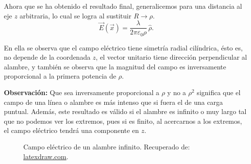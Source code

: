 Ahora que se ha obtenido el resultado final, generalicemos para una distancia al eje $z$ arbitraria, lo cual se logra al sustituir $R \rightarrow \rho$.
$$\vec{E}(\Vec{x}) = \frac{\lambda}{2 \pi \varepsilon_0 \rho}\, \hat{\rho}.$$

En ella se observa que el campo eléctrico tiene simetría radial cilíndrica, ésto es, no depende de la coordenada $z$, el vector unitario tiene dirección perpendicular al alambre, y también se observa que la magnitud del campo es inversamente proporcional a la primera potencia de $\rho$.

\textbf{Observación:} Que sea inversamente proporcional a $\rho$ y no a $\rho^2$ significa que el campo de una línea o alambre es más intenso que si fuera el de una carga puntual. Además, este resultado es válido si el alambre es infinito o muy largo tal que no podemos ver los extremos, pues si es finito, al acercarnos a los extremos, el campo eléctrico tendrá una componente en $z$.

\begin{figure}[H]
\centering
\resizebox{12cm}{6cm}{%

}
\caption{Campo eléctrico de un alambre infinito. Recuperado de: \href{https://latexdraw.com/electric-field-of-line-charge-in-tikz/}{latexdraw.com}.}
\end{figure}

